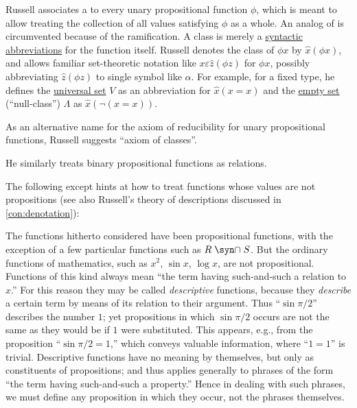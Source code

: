 \begin{remark}
\begin{thmenum}
    Russell associates a  to every unary propositional function \( \phi \), which is meant to allow treating the collection of all values satisfying \( \phi \) as a whole. An analog of  is circumvented because of the ramification. A class is merely a \hyperref[con:syntactic_abbreviation]{syntactic abbreviations} for the function itself. Russell denotes the class of \( \phi x \) by \( \hat x (\phi x) \), and allows familiar set-theoretic notation like \( x \varepsilon \hat z (\phi z) \) for \( \phi x \), possibly abbreviating \( \hat z (\phi z) \) to single symbol like \( \alpha \). For example, for a fixed type, he defines the \hyperref[def:universal_set]{universal set} \( V \) as an abbreviation for \( \hat x (x = x) \) and the \hyperref[def:empty_set]{empty set} (\enquote{null-class}) \( \Lambda \) as \( \hat x (\neg (x = x)) \).

    As an alternative name for the axiom of reducibility for unary propositional functions, Russell suggests \enquote{axiom of classes}.

    He similarly treats binary propositional functions as relations.

     The following except hints at how to treat functions whose values are not propositions (see also Russell's theory of descriptions discussed in \cref{con:denotation}):
    \begin{displayquote}
      The functions hitherto considered have been propositional functions, with the exception of a few particular functions such as \( R \mathrel{\syn\cap} S \). But the ordinary functions of mathematics, such as \( x^2 \), \( \sin x \), \( \log x \), are not propositional. Functions of this kind always mean \enquote{the term having such-and-such a relation to \( x \).} For this reason they may be called \textit{descriptive} functions, because they \textit{describe} a certain term by means of its relation to their argument. Thus \enquote{\( \sin \pi / 2 \)} describes the number \( 1 \); yet propositions in which \( \sin \pi / 2 \) occurs are not the same as they would be if \( 1 \) were substituted. This appears, e.g., from the proposition \enquote{\( \sin \pi / 2 = 1 \),} which conveys valuable information, where \enquote{\( 1 = 1 \)} is trivial. Descriptive functions have no meaning by themselves, but only as constituents of propositions; and thus applies generally to phrases of the form \enquote{the term having such-and-such a property.} Hence in dealing with such phrases, we must define any proposition in which they occur, not the phrases themselves.
    \end{displayquote}


\end{thmenum}
\end{remark}
